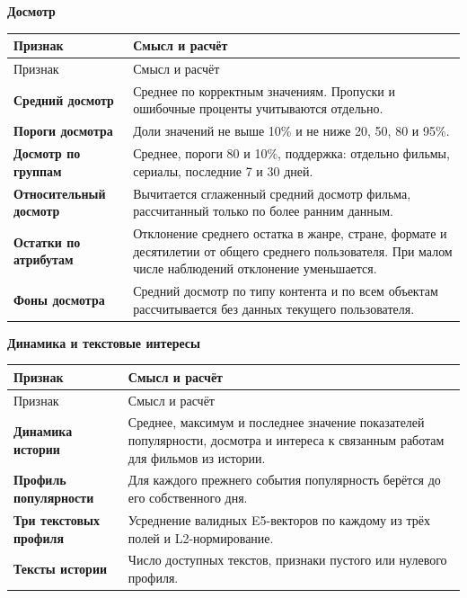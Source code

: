 \documentclass[11pt,a4paper]{article}
\begin{document}
\textbf{Досмотр}


\begin{longtable}{>{\raggedright\arraybackslash}p{4.1cm}>{\raggedright\arraybackslash}p{10.8cm}}
\toprule
Признак & Смысл и расчёт \\
\midrule
\endfirsthead
\toprule
Признак & Смысл и расчёт \\
\midrule
\endhead
\textbf{Средний досмотр} & Среднее по корректным значениям. Пропуски и ошибочные проценты учитываются отдельно. \\[4pt]
\textbf{Пороги досмотра} & Доли значений не выше 10\% и не ниже 20, 50, 80 и 95\%. \\[4pt]
\textbf{Досмотр по группам} & Среднее, пороги 80 и 10\%, поддержка: отдельно фильмы, сериалы, последние 7 и 30 дней. \\[4pt]
\textbf{Относительный досмотр} & Вычитается сглаженный средний досмотр фильма, рассчитанный только по более ранним данным. \\[4pt]
\textbf{Остатки по атрибутам} & Отклонение среднего остатка в жанре, стране, формате и десятилетии от общего среднего пользователя. При малом числе наблюдений отклонение уменьшается. \\[4pt]
\textbf{Фоны досмотра} & Средний досмотр по типу контента и по всем объектам рассчитывается без данных текущего пользователя. \\[4pt]
\bottomrule
\end{longtable}

\newpage

\textbf{Динамика и текстовые интересы}


\begin{longtable}{>{\raggedright\arraybackslash}p{4.1cm}>{\raggedright\arraybackslash}p{10.8cm}}
\toprule
Признак & Смысл и расчёт \\
\midrule
\endfirsthead
\toprule
Признак & Смысл и расчёт \\
\midrule
\endhead
\textbf{Динамика истории} & Среднее, максимум и последнее значение показателей популярности, досмотра и интереса к связанным работам для фильмов из истории. \\[4pt]
\textbf{Профиль популярности} & Для каждого прежнего события популярность берётся до его собственного дня. \\[4pt]
\textbf{Три текстовых профиля} & Усреднение валидных E5-векторов по каждому из трёх полей и L2-нормирование. \\[4pt]
\textbf{Тексты истории} & Число доступных текстов, признаки пустого или нулевого профиля. \\[4pt]
\bottomrule
\end{longtable}
\end{document}
